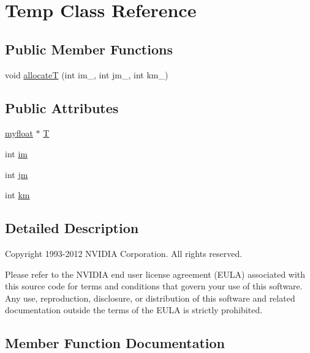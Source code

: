 \hypertarget{classTemp}{}\section{Temp Class Reference}
\label{classTemp}
\subsection*{Public Member Functions}
\begin{DoxyCompactItemize}
\item 
void \hyperlink{classTemp_ab13fc845b170b235348f8092a35d501a}{allocateT} (int im\+\_\+, int jm\+\_\+, int km\+\_\+)
\end{DoxyCompactItemize}
\subsection*{Public Attributes}
\begin{DoxyCompactItemize}
\item 
\hyperlink{param_8h_a5f097c9f3873af7be7fc156e6a06ca5e}{myfloat} $\ast$ \hyperlink{classTemp_a1423b2032708c9aa843847ab189d3d38}{T}
\item 
int \hyperlink{classTemp_a2e7dc5e9a21b8f12c03ec22e1bcb60e2}{im}
\item 
int \hyperlink{classTemp_ab953aa045fbf74f31fe75954951d91e1}{jm}
\item 
int \hyperlink{classTemp_a937fbafc62103f16ba9efa38c40c1be5}{km}
\end{DoxyCompactItemize}


\subsection{Detailed Description}
Copyright 1993-\/2012 N\+V\+I\+D\+IA Corporation. All rights reserved.

Please refer to the N\+V\+I\+D\+IA end user license agreement (E\+U\+LA) associated with this source code for terms and conditions that govern your use of this software. Any use, reproduction, disclosure, or distribution of this software and related documentation outside the terms of the E\+U\+LA is strictly prohibited. 

\subsection{Member Function Documentation}
\mbox{\label{classTemp_ab13fc845b170b235348f8092a35d501a}} 
